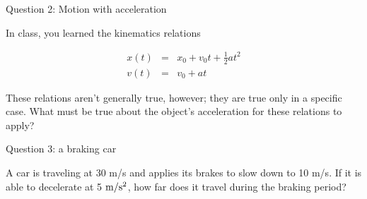 \documentclass[12pt]{article}
\begin{document}
\vspace{3in}
\newpage
\centerline{\Large Question 2: Motion with acceleration}

In class, you learned the kinematics relations

\begin{align*}
x(t) &=& x_0 + v_0t + \frac{1}{2}at^2 \\
v(t) &=& v_0 + at
\end{align*}

These relations aren't generally true, however; they are true only in a specific case. What must be true about the object's acceleration for these relations to apply?

\vspace{1.2in}
\newpage

\centerline{\Large Question 3: a braking car}

A car is traveling at 30 m/s and applies its brakes to slow down to 10 m/s. If it is able to decelerate at 5 $\rm m/\rm s^2$, how far does it travel during the braking period?
\end{document}
